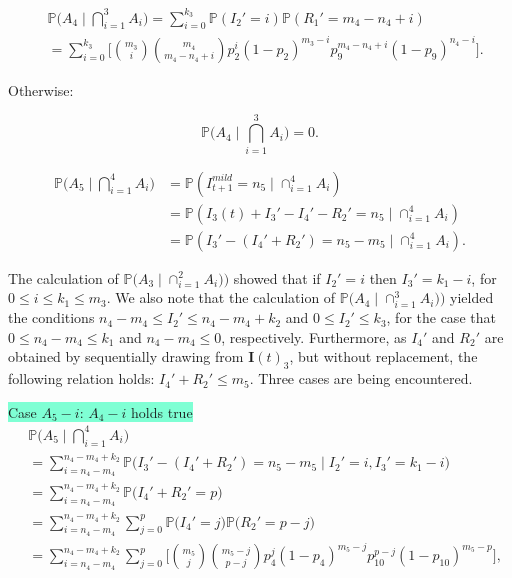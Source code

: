 \documentclass[a4paper]{article}
\renewcommand{\vec}[1]{\boldsymbol{#1}}
\theoremstyle{remark}
\begin{document}
\begin{equation*}
\begin{split}
&\mathbb{P}\bigg(A_{4}\mid \bigcap_{i=1}^{3}A_{i}\bigg)= \sum_{i=0}^{k_3} \mathbb{P}(I_{2}'=i)\mathbb{P}(R_{1}'=m_4-n_4+i)\\
&= \sum_{i=0}^{k_3}\Bigg[{m_3 \choose i}{m_4 \choose m_4-n_4+i}p_2^{i}(1-p_2)^{m_3-i}p_9^{m_4-n_4+i}(1-p_9)^{n_4-i}\Bigg].
\end{split}
\end{equation*}


\medskip
Otherwise:

\[\mathbb{P}\bigg(A_{4}\mid \bigcap_{i=1}^{3}A_{i}\bigg)=0.\]

\medskip

\hline

\begin{align*}
   \mathbb{P}\bigg(A_{5}\mid \bigcap_{i=1}^{4}A_{i}\bigg)&=\mathbb{P}(I_{t+1}^{mild}=n_5 \mid \cap_{i=1}^{4}A_{i} ) \\
   &= \mathbb{P}(I_3(t)+I_{3}'-I_{4}'-R_{2}'=n_5 \mid \cap_{i=1}^{4}A_{i})\\
   &= \mathbb{P}(I_{3}'-(I_{4}'+R_{2}')=n_5-m_5\mid \cap_{i=1}^{4}A_{i}).
\end{align*}

The calculation of $\mathbb{P}\big( A_{3}\mid \cap_{i=1}^{2}A_{i}\big))$ showed that if $I_{2}'=i$ then $I_{3}' = k_1-i$, for $0\leq i \leq k_1 \leq m_3$. We also note that the calculation of $\mathbb{P}\big( A_{4}\mid \cap_{i=1}^{3}A_{i}\big))$ yielded the conditions  $n_4-m_4\leq I_{2}'\leq n_4-m_4+k_2$ and $0\leq I_{2}'\leq k_3$, for the case that $0\leq n_4-m_4\leq k_1$ and $n_4-m_4 \leq 0$, respectively. Furthermore, as $I_{4}'$ and $R_{2}'$ are obtained by sequentially drawing from $\vec{I}(t)_3$, but without replacement, the following relation holds: $I_{4}'+R_{2}'\leq m_5$. Three cases are being encountered.

\medskip
\colorbox{Aquamarine}{Case $A_5-i$: $A_4-i$ holds true}   
\begin{equation*}
\begin{split}
&\mathbb{P}\bigg(A_{5}\mid \bigcap_{i=1}^{4}A_{i}\bigg)\\
&=\sum_{i=n_4-m_4}^{n_4-m_4+k_2} \mathbb{P}\bigg(I_{3}'-(I_{4}'+R_{2}')=n_5-m_5\mid I_{2}'=i, I_{3}'=k_1-i\bigg)\\ 
&= \sum_{i=n_4-m_4}^{n_4-m_4+k_2} \mathbb{P}\bigg(I_{4}'+R_{2}'=p\bigg)\\
&=\sum_{i=n_4-m_4}^{n_4-m_4+k_2}\sum_{j=0}^{p} \mathbb{P}\bigg(I_{4}'=j\bigg) \mathbb{P}\bigg(R_{2}'=p-j\bigg)\\
&=\sum_{i=n_4-m_4}^{n_4-m_4+k_2}\sum_{j=0}^{p} \Bigg[{m_5 \choose j}{m_5-j \choose p-j}p_4^{j}(1-p_4)^{m_5-j}p_{10}^{p-j}(1-p_{10})^{m_5-p}\Bigg],
\end{split}
\end{equation*}
\end{document}

